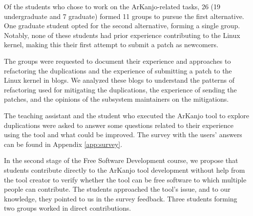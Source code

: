 Of the students who chose to work on the ArKanjo-related tasks, 26 (19 undergraduate and 7 graduate) 
formed 11 groups to pursue the first alternative. One graduate student opted for the second alternative, 
forming a single group. Notably, none of these students had prior experience contributing to the 
Linux kernel, making this their first attempt to submit a patch as newcomers.

The groups were requested to document their experience and approaches to refactoring the 
duplications and the experience of submitting a patch to the Linux kernel in blogs. We analyzed 
these blogs to understand the patterns of refactoring used for mitigating the duplications, the 
experience of sending the patches, and the opinions of the subsystem maintainers on the mitigations.

The teaching assistant and the student who executed the ArKanjo tool to explore duplications were 
asked to answer some questions related to their experience using the tool and what could be improved. 
The survey with the users' answers can be found in Appendix \ref{app:survey}.

In the second stage of the Free Software Development course, we propose that students contribute 
directly to the ArKanjo tool development without help from the tool creator to verify whether the 
tool can be free software to which multiple people can contribute. The students approached the tool’s 
issue, and to our knowledge, they pointed to us in the survey feedback. Three students forming two 
groups worked in direct contributions.
